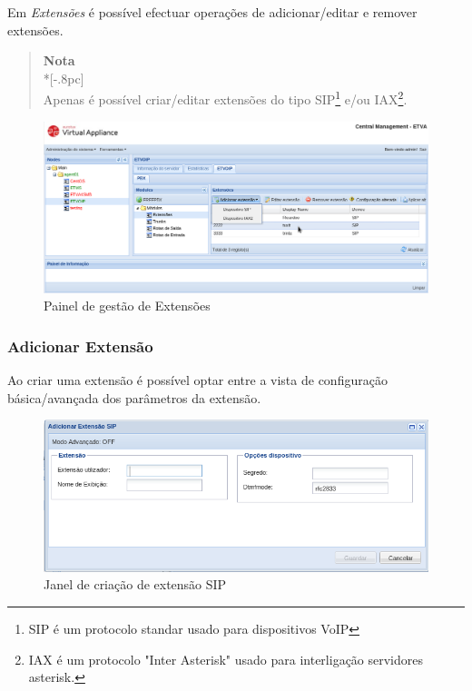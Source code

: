 Em \emph{Extensões} é possível efectuar operações de adicionar/editar e remover extensões.

\begin{quote}
	{\large \bf Nota} \\*[-.8pc]
	\underline{\hspace{6in}} \\
    Apenas é possível criar/editar extensões do tipo SIP\footnote{SIP é um protocolo standar usado para dispositivos VoIP} e/ou IAX\footnote{IAX é um protocolo "Inter Asterisk" usado para interligação servidores asterisk.}.
\end{quote}

\begin{figure}[H]
        \begin{center}
        \includegraphics[scale=0.4]{screenshots/etvoip_pbx_extensions.png}
        \caption{Painel de gestão de Extensões}
        \label{fig:etvoip_pbx_extensions}
        \end{center}
\end{figure}


\subsubsection{Adicionar Extensão}
\label{sec:etvoip_pbx_extensions_add}

Ao criar uma extensão é possível optar entre a vista de configuração básica/avançada dos parâmetros da extensão.

\begin{figure}[H]
        \begin{center}
        \includegraphics[scale=0.4]{screenshots/etvoip_pbx_extensions_sip.png}
        \caption{Janel de criação de extensão SIP}
        \label{fig:etvoip_pbx_extensions_sip}
        \end{center}
\end{figure}


